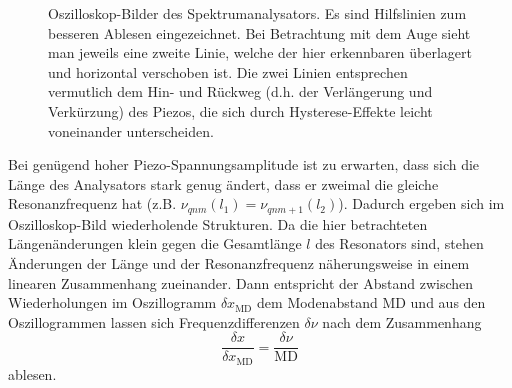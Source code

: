 \documentclass{article}
\newcommand{\mr}{\mathrm}
\begin{document}
\begin{figure}[h]
\begin{subfigure}{0.49\textwidth}
    \label{fig:analysator-lang}
  \end{subfigure}
  \caption{
    Oszilloskop-Bilder des Spektrumanalysators. Es sind Hilfslinien zum besseren Ablesen eingezeichnet.
    Bei Betrachtung mit dem Auge sieht man jeweils eine zweite Linie,
    welche der hier erkennbaren überlagert und horizontal verschoben ist.
    Die zwei Linien entsprechen vermutlich dem Hin- und Rückweg (d.h. der Verlängerung und Verkürzung) des Piezos, die sich
    durch Hysterese-Effekte leicht voneinander unterscheiden.}
  \label{fig:analysator}
\end{figure}
Bei genügend hoher Piezo-Spannungsamplitude ist zu erwarten, dass sich die Länge des Analysators stark genug ändert,
dass er zweimal die gleiche Resonanzfrequenz hat (z.B. $\nu_{qnm}(l_1) = \nu_{qnm+1}(l_2)$).
Dadurch ergeben sich im Oszilloskop-Bild wiederholende Strukturen. Da die hier betrachteten Längenänderungen klein
gegen die Gesamtlänge $l$ des Resonators sind, stehen Änderungen der Länge und der Resonanzfrequenz näherungsweise
in einem linearen Zusammenhang zueinander. Dann entspricht der Abstand zwischen Wiederholungen im Oszillogramm $\delta x_\mr{MD}$
dem Modenabstand $\mr{MD}$ und aus den Oszillogrammen lassen sich Frequenzdifferenzen $\delta\nu$ nach dem Zusammenhang
\begin{equation}
  \frac{\delta x}{\delta x_\mr{MD}} = \frac{\delta \nu}{\mr{MD}} \label{eq:analyser-md-ratio}
\end{equation}
ablesen.
\end{document}
